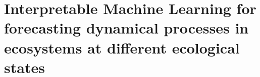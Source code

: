 %
\chapter{Interpretable Machine Learning for forecasting dynamical processes in ecosystems at different ecological states}
\label{sec:sciml}